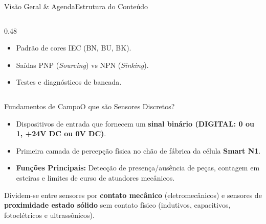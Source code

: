 \begin{senaiframe}{Visão Geral \& Agenda}{Estrutura do Conteúdo}
\begin{columns}[t]
\begin{column}{0.48\textwidth}
\begin{tcolorbox}[senairedcard, title={2. Sensores Indutivos}]
\begin{itemize}
        \end{itemize}
      \end{tcolorbox}
      \vspace{4pt}
      \begin{tcolorbox}[senaigreencard, title={4. Esquema elétrico PNP / NPN}]
        \begin{itemize}
          \item Padrão de cores IEC (BN, BU, BK).
          \item Saídas PNP (\textit{Sourcing}) vs NPN (\textit{Sinking}).
          \item Testes e diagnósticos de bancada.
        \end{itemize}
      \end{tcolorbox}
    \end{column}
  \end{columns}
\end{senaiframe}

\begin{senaiframe}{Fundamentos de Campo}{O que são Sensores Discretos?}
  \begin{itemize}
    \item Dispositivos de entrada que fornecem um \textbf{sinal binário (DIGITAL: 0 ou 1, +24V DC ou 0V DC)}.
    \item Primeira camada de percepção física no chão de fábrica da célula \textbf{Smart N1}.
    \item \textbf{Funções Principais:} Detecção de presença/ausência de peças, contagem em esteiras e limites de curso de atuadores mecânicos.
  \end{itemize}

  \vspace{6pt}
  \begin{tcolorbox}[senaibluecard, title={Tipos Físicos}]
    Dividem-se entre sensores por \textbf{contato mecânico} (eletromecânicos) e sensores de \textbf{proximidade estado sólido} sem contato físico (indutivos, capacitivos, fotoelétricos e ultrassônicos).
  \end{tcolorbox}
\end{senaiframe}

